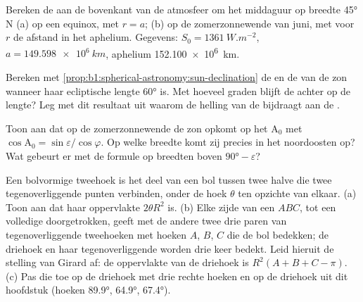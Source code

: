 \begin{exercise}[$\star\star$]\label{exo:b1:spherical-astronomy:9}
Bereken de  aan de bovenkant van de atmosfeer om het middaguur op
breedte \ang{45} N (a) op een equinox, met $r = a$; (b) op de zomerzonnewende
van juni, met voor $r$ de afstand in het aphelium. Gegevens: $S_0 = \qty{1361}{W.m^{-2}}$,
$a = \qty{149.598e6}{km}$, aphelium \qty{152.100e6}{km}.
\end{exercise}

\begin{exercise}[$\star\star\star$]\label{exo:b1:spherical-astronomy:10}
Bereken met \cref{prop:b1:spherical-astronomy:sun-declination} de  en
de  van de zon wanneer haar ecliptische lengte \ang{60} is. Met
hoeveel graden blijft de  achter op de lengte? Leg met dit
resultaat uit waarom de helling van de  bijdraagt aan de
.
\end{exercise}

\begin{exercise}[$\star\star\star$]\label{exo:b1:spherical-astronomy:11}
Toon aan dat op de zomerzonnewende de zon opkomt op het  $\mathrm{A}_0$
met $\cos\mathrm{A}_0 = \sin\varepsilon/\cos\varphi$. Op welke breedte komt zij
precies in het noordoosten op? Wat gebeurt er met de formule op breedten boven
$\ang{90} - \varepsilon$?
\end{exercise}

\begin{exercise}[$\star\star\star$]\label{exo:b1:spherical-astronomy:12}
Een bolvormige tweehoek is het deel van een bol tussen twee halve 
die twee tegenoverliggende punten verbinden, onder de hoek $\theta$ ten opzichte
van elkaar. (a) Toon aan dat haar oppervlakte $2\theta R^2$ is. (b) Elke zijde
van een  $ABC$, tot een volledige  doorgetrokken,
geeft met de andere twee drie paren van tegenoverliggende tweehoeken met hoeken
$A$, $B$, $C$ die de bol bedekken; de driehoek en haar tegenoverliggende worden
drie keer bedekt. Leid hieruit de stelling van Girard af: de oppervlakte van de
driehoek is $R^2(A + B + C - \pi)$. (c) Pas die toe op de driehoek met drie
rechte hoeken en op de driehoek uit dit hoofdstuk (hoeken \ang{89.9},
\ang{64.9}, \ang{67.4}).
\end{exercise}

